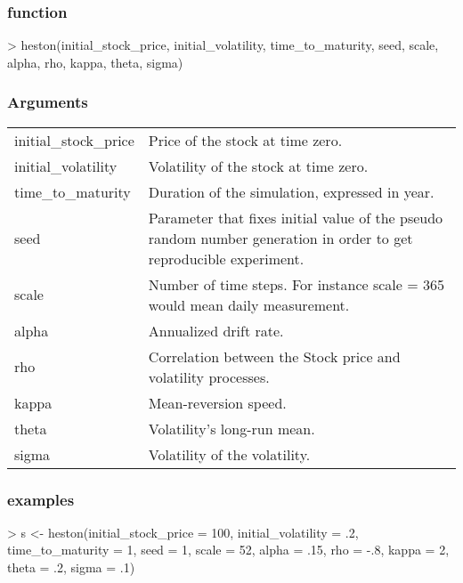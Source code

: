 \documentclass[12pt]{report}
\begin{document}
\begin{appendices}
\subsubsection*{function}

\begin{Schunk}
\begin{Sinput}
> heston(initial_stock_price, initial_volatility, time_to_maturity, 
        seed, scale, alpha, rho, kappa, theta, sigma)
\end{Sinput}
\end{Schunk}

\subsubsection*{Arguments}

\begin{tabularx}{\textwidth}{lX}
  initial\_stock\_price & Price of the stock at time zero.\\
  initial\_volatility & Volatility of the stock at time zero.\\
  time\_to\_maturity & Duration of the simulation, expressed in year.\\
  seed & Parameter that fixes initial value of the pseudo random number generation in order to get reproducible experiment. \\
  scale & Number of time steps. For instance scale = 365 would mean daily measurement.\\
  alpha & Annualized drift rate. \\
  rho & Correlation between the Stock price and volatility processes.\\
  kappa & Mean-reversion speed. \\
  theta & Volatility's long-run mean. \\
  sigma & Volatility of the volatility. 
\end{tabularx}

\subsubsection*{examples}
\label{sec:r:time:geometric:ex}

\begin{Schunk}
\begin{Sinput}
> s <- heston(initial_stock_price = 100,
             initial_volatility = .2,
             time_to_maturity = 1,
             seed = 1,
             scale = 52,
             alpha = .15,
             rho = -.8,
             kappa = 2,
             theta = .2,
             sigma = .1)
\end{Sinput}
\end{Schunk}



\end{appendices}
\end{document}
